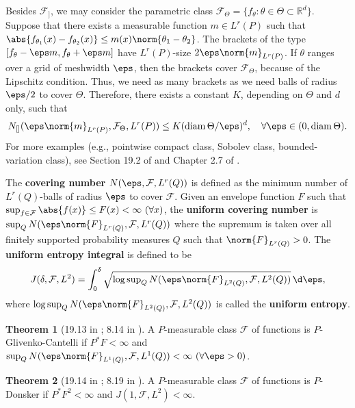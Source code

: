 \documentclass[11pt, a3paper, openany]{article}
\newcommand{\R}{\ensuremath{\mathbb{R}}}
\theoremstyle{remark}
\theoremstyle{remark}
\theoremstyle{remark}
\newenvironment{Proof of claim}
  {\begin{proof}[\normalfont \textbf{Proof of claim}]}
  {\end{proof}}
\theoremstyle{definition}
\newtheorem*{Theo}{Theorem}
\theoremstyle{remark}
\theoremstyle{plain}
\begin{document}
Besides $\mathcal{F}_{]}$, we may consider the parametric class $\mathcal{F}_{\Theta} = \{ f_{\theta} : \theta \in \Theta \subset \R^{d} \}$. Suppose that there exists a measurable function $m \in L^{r}(P)$ such that $\abs{f_{\theta_{1}}(x)-f_{\theta_{2}}(x)} \leq m(x) \norm{\theta_{1}-\theta_{2}}$. The brackets of the type $[f_{\theta} - \eps m, f_{\theta} + \eps m]$ have $L^{r}(P)$-size $2 \eps \norm{m}_{L^{r}(P)}$. If $\theta$ ranges over a grid of meshwidth $\eps$, then the brackets cover $\mathcal{F}_{\Theta}$, because of the
Lipschitz condition. Thus, we need as many brackets as we need balls of radius $\eps/2$ to cover $\Theta$. Therefore, there exists a constant $K$, depending on $\Theta$ and $d$ only, such that 
\[ N_{[]}(\eps\norm{m}_{L^{r}(P)}, \mathcal{F}_{\Theta}, L^{r}(P)) \leq K (\operatorname{diam}\Theta/\eps)^{d} , \quad \forall \eps \in (0, \operatorname{diam}\Theta) . \]
For more examples (e.g., pointwise compact class, Sobolev class, bounded-variation class), see Section 19.2 of \cite{vdVaart1998asymptotic} and Chapter 2.7 of \cite{vdVaart-Wellner-1996-Weak}.

The \textbf{covering number} $N(\eps,\mathcal{F},L^{r}(Q))$ is defined as the minimum number of $L^{r}(Q)$-balls of radius $\eps$ to cover $\mathcal{F}$. Given an envelope function $F$ such that $\sup_{f\in\mathcal{F}} \abs{f(x)} \leq F(x) < \infty \ (\forall x)$, the \textbf{uniform covering number} is $\sup_{Q} N(\eps\norm{F}_{L^{r}(Q)}, \mathcal{F}, L^{r}(Q))$ where the supremum is taken over all finitely supported probability measures $Q$ such that $\norm{F}_{L^{r}(Q)} > 0$.
The \textbf{uniform entropy integral} is defined to be 
\[ J(\delta,\mathcal{F},L^{2}) = \int_{0}^{\delta} \sqrt{\log \sup\nolimits_{Q} N(\eps\norm{F}_{L^{2}(Q)}, \mathcal{F}, L^{2}(Q))} \,\d \eps , \]
where $\log \sup_{Q} N(\eps\norm{F}_{L^{2}(Q)}, \mathcal{F}, L^{2}(Q))$ is called the \textbf{uniform entropy}.

\begin{Theo}[19.13 in \cite{vdVaart1998asymptotic}; 8.14 in \cite{Kosorok2008Introduction}]
A $P$-measurable class $\mathcal{F}$ of functions is $P$-Glivenko-Cantelli if $P^{*}F < \infty$ and $\sup_{Q} N(\eps\norm{F}_{L^{1}(Q)},\mathcal{F},L^{1}(Q)) < \infty \ (\forall \eps > 0)$.
\end{Theo}

\begin{Theo}[19.14 in \cite{vdVaart1998asymptotic}; 8.19 in \cite{Kosorok2008Introduction}]
A $P$-measurable class $\mathcal{F}$ of functions is $P$-Donsker if $P^{*}F^{2} < \infty$ and $J(1,\mathcal{F},L^{2}) < \infty$.
\end{Theo}
\end{document}
